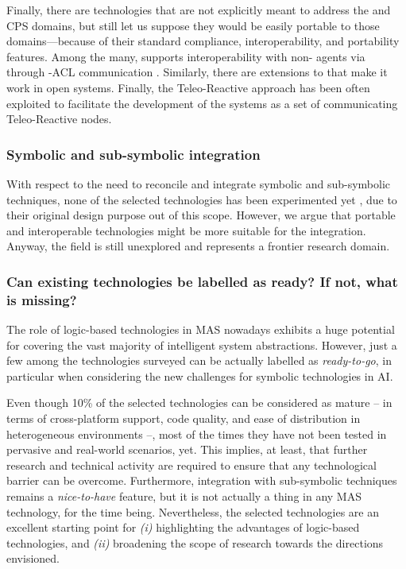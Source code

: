 \documentclass[12pt,a4paper,openright,twoside]{book}
\begin{document}
Finally, there are technologies that are not explicitly meant to address the \iot{} and CPS domains, but still let us suppose they would be easily portable to those domains---because of their standard compliance, interoperability, and portability features.
%
Among the many, \jason{} \cite{jason-clima2005} supports interoperability with non-\jason{} agents via \jade{} \cite{jade-mapbook2005} through \fipa{}-ACL communication \cite{fipa-acl}.
%
Similarly, there are extensions to \jack{} \cite{jack-mapbook2005} that make it work in open systems.
%
Finally, the Teleo-Reactive \cite{nilsson2001-teleoreactive} approach has been often exploited to facilitate the development of the \iot{} systems as a set of communicating Teleo-Reactive nodes.

\subsubsection{Symbolic and sub-symbolic integration}

With respect to the need to reconcile and integrate symbolic and sub-symbolic techniques, none of the selected technologies has been experimented yet \cite{xaisurvey-ia14}, due to their original design purpose out of this scope.
%
However, we argue that portable and interoperable technologies might be more suitable for the integration.
%
Anyway, the field is still unexplored and represents a frontier research domain.

\subsubsection{Can existing technologies be labelled as ready? If not, what is missing?}

The role of logic-based technologies in MAS nowadays exhibits a huge potential for covering the vast majority of intelligent system abstractions.
%
However, just a few among the technologies surveyed can be actually labelled as \emph{ready-to-go}, in particular when considering the new challenges for symbolic technologies in AI.

Even though 10\% of the selected technologies can be considered as mature -- in terms of cross-platform support, code quality, and ease of distribution in heterogeneous environments --, most of the times they have not been tested in pervasive and real-world scenarios, yet.
%
This implies, at least, that further research and technical activity are required to ensure that any technological barrier can be overcome.
%
Furthermore, integration with sub-symbolic techniques remains a \emph{nice-to-have} feature, but it is not actually a thing in any MAS technology, for the time being.
%
Nevertheless, the selected technologies are an excellent starting point for \emph{(i)} highlighting the advantages of logic-based technologies, and  \emph{(ii)} broadening the scope of research towards the directions envisioned.
\end{document}
